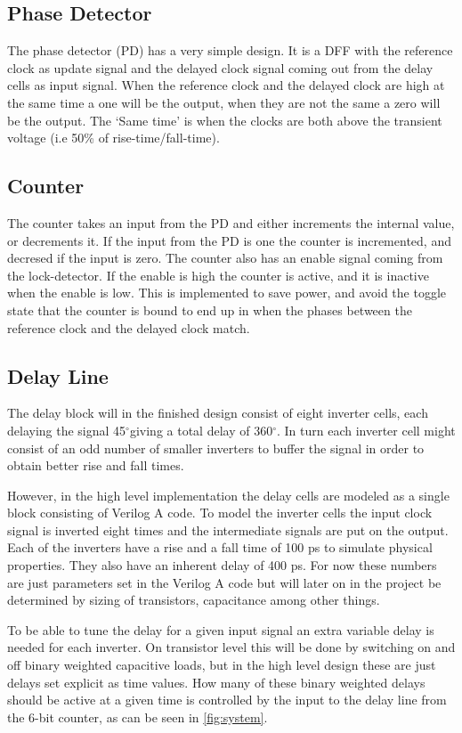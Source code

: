 \documentclass[a4paper,12pt]{article} \usepackage{graphicx}
\newcommand{\degree}{\ensuremath{^\circ}}
\begin{document}
\subsection{Phase Detector}
The phase detector (PD) has a very simple design. It is a DFF with the
reference clock as update signal and the delayed clock signal coming
out from the delay cells as input signal. When the reference clock and
the delayed clock are high at the same time a one will be the output,
when they are not the same a zero will be the output. The `Same time' is
 when the clocks are both above the transient voltage (i.e 50\% of
 rise-time/fall-time).
 
\subsection{Counter}
The counter takes an input from the PD and either increments
the internal value, or decrements it. If the input from the PD is one the
counter is incremented, and decresed if the input is zero. The counter also has
an enable signal coming from the lock-detector. If the enable is high the counter
is active, and it is inactive when the enable is low. This is implemented to 
save power, and avoid the toggle state that the counter is bound to end up in when
the phases between the reference clock and the delayed clock match.


\subsection{Delay Line}
The delay block will in the finished design consist of eight inverter cells,
each delaying the signal 45\degree giving a total delay of 360\degree. In turn
each inverter cell might consist of an odd number of smaller inverters to buffer
the signal in order to obtain better rise and fall times.

However, in the high level implementation the delay cells are modeled
as a single block consisting of Verilog A code. To model the inverter
cells the input clock signal is inverted eight times and the intermediate
signals are put on the output. Each of the inverters have a rise and a
fall time of 100 ps to simulate physical properties. They also have an
inherent delay of 400 ps. For now these numbers are just parameters set
in the Verilog A code but will later on in the project be determined
by sizing of transistors, capacitance among other things.

To be able to tune the delay for a given input signal an extra
variable delay is needed for each inverter. On transistor level this
will be done by switching on and off binary weighted capacitive loads,
but in the high level design these are just delays set explicit as time
values. How many of these binary weighted delays should be active at a
given time is controlled by the input to the delay line from the 6-bit
counter, as can be seen in \ref{fig:system}. 
\end{document}
